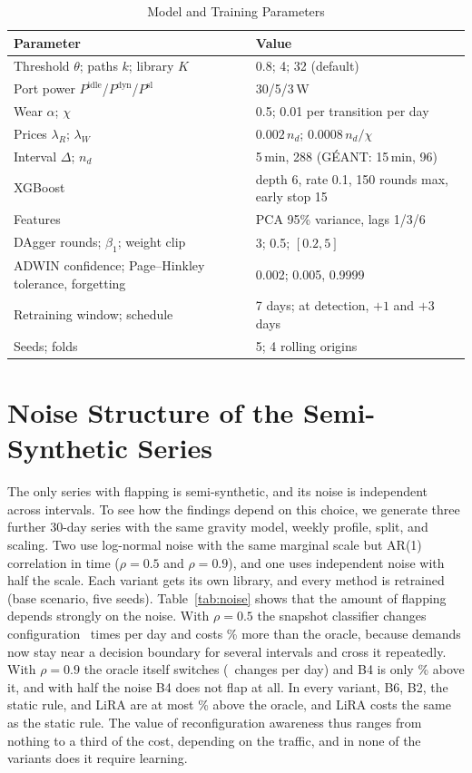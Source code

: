 \documentclass[preprint,12pt]{elsarticle}
\begin{document}
\begin{table}[h!]
\centering
\caption{Model and Training Parameters}
\label{tab:params}
\footnotesize
\setlength{\tabcolsep}{3pt}
\begin{tabular}{@{}p{3.9cm}p{4.6cm}@{}}
\toprule
Parameter & Value \\
\midrule
Threshold $\theta$; paths $k$; library $K$ & 0.8; 4; 32 (default) \\
Port power $P^{\mathrm{idle}}$/$P^{\mathrm{dyn}}$/$P^{\mathrm{sl}}$ & 30/5/3\,W \\
Wear $\alpha$; $\chi$ & 0.5; 0.01 per transition per day \\
Prices $\lambda_R$; $\lambda_W$ & $0.002\,n_d$; $0.0008\,n_d/\chi$ \\
Interval $\Delta$; $n_d$ & 5\,min, 288 (G\'{E}ANT: 15\,min, 96) \\
XGBoost & depth 6, rate 0.1, 150 rounds max, early stop 15 \\
Features & PCA 95\% variance, lags 1/3/6 \\
DAgger rounds; $\beta_1$; weight clip & 3; 0.5; $[0.2,5]$ \\
ADWIN confidence; Page--Hinkley tolerance, forgetting & 0.002; 0.005, 0.9999 \\
Retraining window; schedule & 7 days; at detection, $+1$ and $+3$ days \\
Seeds; folds & 5; 4 rolling origins \\
\bottomrule
\end{tabular}
\end{table}


\section{Noise Structure of the Semi-Synthetic Series}\label{sec:res-noise}

The only series with flapping is semi-synthetic, and its noise is independent across intervals. To see how the findings depend on this choice, we generate three further 30-day series with the same gravity model, weekly profile, split, and scaling. Two use log-normal noise with the same marginal scale but AR(1) correlation in time ($\rho=0.5$ and $\rho=0.9$), and one uses independent noise with half the scale. Each variant gets its own library, and every method is retrained (base scenario, five seeds). Table~\ref{tab:noise} shows that the amount of flapping depends strongly on the noise. With $\rho=0.5$ the snapshot classifier changes configuration \nzarABfourChg\ times per day and costs \nzarAExcess\% more than the oracle, because demands now stay near a decision boundary for several intervals and cross it repeatedly. With $\rho=0.9$ the oracle itself switches (\nzarBOChg\ changes per day) and B4 is only \nzarBExcess\% above it, and with half the noise B4 does not flap at all. In every variant, B6, B2, the static rule, and LiRA are at most \nzarBLiRAgap\% above the oracle, and LiRA costs the same as the static rule. The value of reconfiguration awareness thus ranges from nothing to a third of the cost, depending on the traffic, and in none of the variants does it require learning.
\end{document}

